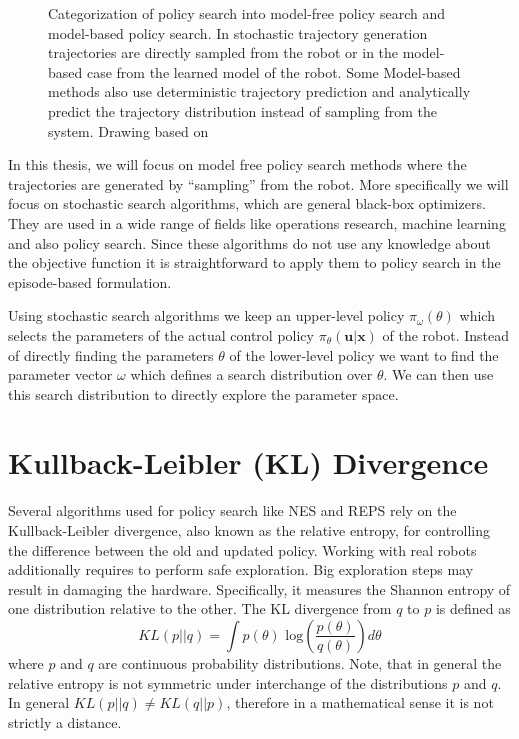 \begin{figure}[ht!]
  \centering
  
    \caption{\small
      Categorization of policy search into model-free policy
      search and model-based policy search.
      In stochastic trajectory generation 
      trajectories are directly sampled from the robot or
      in the model-based case from the learned model of the robot.
      Some Model-based methods also use deterministic trajectory prediction 
      and analytically predict the trajectory distribution
      instead of sampling from the system. Drawing based on
      \citet{deisenroth2013survey}
    }
    \label{fig:policy}
\end{figure}



In this thesis, we will focus on model free policy search methods
where the trajectories are generated by ``sampling'' from
the robot.
More specifically we will focus on stochastic
search algorithms, which are general black-box optimizers.
They are used in a wide range of fields like operations research,
machine learning and also policy search.
Since these algorithms do not use any knowledge about the
objective function it is straightforward to
apply them to policy search in the episode-based formulation.

Using stochastic search algorithms we keep an upper-level policy
$\pi_{\omega}(\theta)$ which selects the parameters of the
actual control policy $\pi_{\theta}(\mathbf{u} | \mathbf{x})$ of the robot.
Instead of directly finding the parameters $\theta$ of the
lower-level policy we want to find the parameter vector $\omega$ which
defines a search distribution over $\theta$. We can then use this
search distribution to directly explore the parameter space.


\section{Kullback-Leibler (KL) Divergence}
Several algorithms used for policy search like
NES \citep{wierstra2014natural} and REPS \citep{peters2010relative}
rely on the Kullback-Leibler divergence, also
known as the relative entropy, for controlling
the difference between the old and updated policy.
Working with real robots additionally requires to perform safe exploration. Big
exploration steps may result in damaging the hardware.
Specifically, it measures the Shannon entropy of one distribution relative to the
other. The KL divergence from $q$ to $p$ is defined as
$$ KL(p || q) = \int p(\theta) \text{ log} \left(\frac{p(\theta)}{q(\theta)}\right)
d \theta $$
where $p$ and $q$ are continuous probability distributions.
Note, that in general the relative entropy is not symmetric under interchange of the
distributions $p$ and $q$. In general $KL(p || q) \neq KL(q || p) $, therefore
in a mathematical sense it is not strictly a distance.

